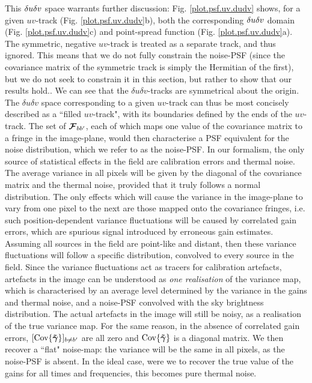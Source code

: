 \pg
This $\delta u\delta v$ space warrants further discussion: Fig. \ref{plot.psf.uv.dudv} shows, for a given $uv$-track (Fig. \ref{plot.psf.uv.dudv}b), both the corresponding $\delta u\delta v$ domain (Fig. \ref{plot.psf.uv.dudv}c) and point-spread function (Fig. \ref{plot.psf.uv.dudv}a). {The symmetric, negative $uv$-track is treated as a separate track, and thus ignored. This means that we do not fully constrain the noise-PSF (since the covariance matrix of the symmetric track is simply the Hermitian of the first), but we do not seek to constrain it in this section, but rather to show that our results hold.}. We can see that the $\delta u \delta v$-tracks are symmetrical about the origin. The $\delta u \delta v$ space corresponding to a given $uv$-track can thus be most concisely described as a ``filled $uv$-track", with its boundaries defined by the ends of the $uv$-track. The set of $\bm{\mathcal{F}}_{bb'}$, each of which maps one value of the covariance matrix to a fringe in the image-plane, would then characterise a PSF equivalent for the noise distribution, which we refer to as the noise-PSF. In our formalism, the only source of statistical effects in the field are calibration errors and thermal noise. The average variance in all pixels will be given by the diagonal of the covariance matrix and the thermal noise, provided that it truly follows a normal distribution. The only effects which will cause the variance in the image-plane to vary from one pixel to the next are those mapped onto the covariance fringes, i.e. such position-dependent variance fluctuations will be caused by correlated gain errors, which are spurious signal introduced by erroneous gain estimates. Assuming all sources in the field are point-like and distant, then these variance fluctuations will follow a specific distribution, convolved to every source in the field.
{Since the variance fluctuations act as tracers for calibration artefacts, artefacts in the image can be understood as \emph{one realisation} of the variance map, which is characterised by an average level determined by the variance in the gains and thermal noise, and a noise-PSF convolved with the sky brightness distribution}. The actual artefacts in the image will still be noisy, as a realisation of the true variance map. For the same reason, in the absence of correlated gain errors, $[\textrm{Cov}\{\bm{\tilde{\gamma}}\}]_{b \ne b'}$ are all zero and $\textrm{Cov}\{\bm{\tilde{\gamma}}\}$ is a diagonal matrix. {We then recover a ``flat" noise-map: the variance will be the same in all pixels, as the noise-PSF is absent}. In the ideal case, were we to recover the true value of the gains for all times and frequencies, this becomes pure thermal noise.
